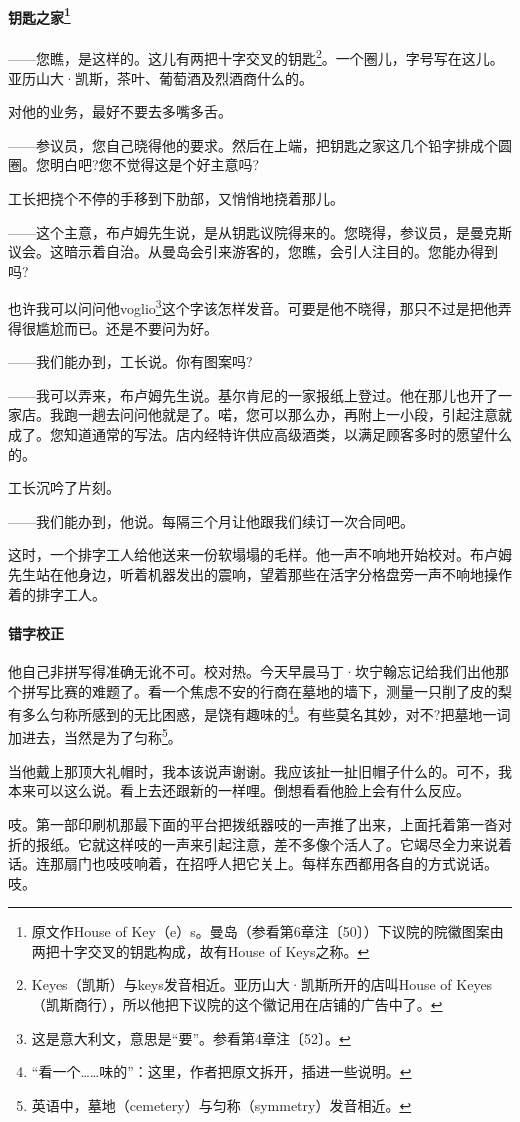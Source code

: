 \paragraph*{钥匙之家\footnote{原文作House of Key（e）s。曼岛（参看第6章注〔50〕）下议院的院徽图案由两把十字交叉的钥匙构成，故有House of Keys之称。}}
\par ——您瞧，是这样的。这儿有两把十字交叉的钥匙\footnote{Keyes（凯斯）与keys发音相近。亚历山大·凯斯所开的店叫House of Keyes（凯斯商行），所以他把下议院的这个徽记用在店铺的广告中了。}。一个圈儿，字号写在这儿。亚历山大·凯斯，茶叶、葡萄酒及烈酒商什么的。
\par 对他的业务，最好不要去多嘴多舌。
\par ——参议员，您自己晓得他的要求。然后在上端，把钥匙之家这几个铅字排成个圆圈。您明白吧?您不觉得这是个好主意吗?
\par 工长把挠个不停的手移到下肋部，又悄悄地挠着那儿。
\par ——这个主意，布卢姆先生说，是从钥匙议院得来的。您晓得，参议员，是曼克斯议会。这暗示着自治。从曼岛会引来游客的，您瞧，会引人注目的。您能办得到吗?
\par 也许我可以问问他voglio\footnote{这是意大利文，意思是“要”。参看第4章注〔52〕。}这个字该怎样发音。可要是他不晓得，那只不过是把他弄得很尴尬而已。还是不要问为好。
\par ——我们能办到，工长说。你有图案吗?
\par ——我可以弄来，布卢姆先生说。基尔肯尼的一家报纸上登过。他在那儿也开了一家店。我跑一趟去问问他就是了。喏，您可以那么办，再附上一小段，引起注意就成了。您知道通常的写法。店内经特许供应高级酒类，以满足顾客多时的愿望什么的。
\par 工长沉吟了片刻。
\par ——我们能办到，他说。每隔三个月让他跟我们续订一次合同吧。
\par 这时，一个排字工人给他送来一份软塌塌的毛样。他一声不响地开始校对。布卢姆先生站在他身边，听着机器发出的震响，望着那些在活字分格盘旁一声不响地操作着的排字工人。
\paragraph*{错字校正}
\par 他自己非拼写得准确无讹不可。校对热。今天早晨马丁·坎宁翰忘记给我们出他那个拼写比赛的难题了。看一个焦虑不安的行商在墓地的墙下，测量一只削了皮的梨有多么匀称所感到的无比困惑，是饶有趣味的\footnote{“看一个……味的”：这里，作者把原文拆开，插进一些说明。}。有些莫名其妙，对不?把墓地一词加进去，当然是为了匀称\footnote{英语中，墓地（cemetery）与匀称（symmetry）发音相近。}。
\par 当他戴上那顶大礼帽时，我本该说声谢谢。我应该扯一扯旧帽子什么的。可不，我本来可以这么说。看上去还跟新的一样哩。倒想看看他脸上会有什么反应。
\par 吱。第一部印刷机那最下面的平台把拨纸器吱的一声推了出来，上面托着第一沓对折的报纸。它就这样吱的一声来引起注意，差不多像个活人了。它竭尽全力来说着话。连那扇门也吱吱响着，在招呼人把它关上。每样东西都用各自的方式说话。吱。
